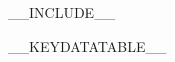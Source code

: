 \documentclass{scrartcl}
\begin{document}
\tableofcontents
\thispagestyle{empty}
\newpage

__INCLUDE__

__KEYDATATABLE__
\end{document}

